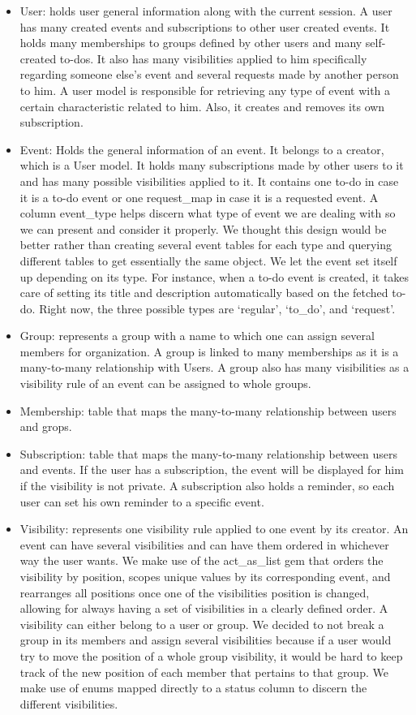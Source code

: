 \documentclass[11pt]{article}
\begin{document}
\begin{itemize}

  \item User: holds user general information along with the current session. A user has many created events and subscriptions to other user created events. It holds many memberships to groups defined by other users and many self-created to-dos. It also has many visibilities applied to him specifically regarding someone else’s event and several requests made by another person to him. A user model is responsible for retrieving any type of event with a certain characteristic related to him. Also, it creates and removes its own subscription.
  \item Event: Holds the general information of an event. It belongs to a creator, which is a User model. It holds many subscriptions made by other users to it and has many possible visibilities applied to it. It contains one to-do in case it is a to-do event or one request\_map in case it is a requested event. A column event\_type helps discern what type of event we are dealing with so we can present and consider it properly. We thought this design would be better rather than creating several event tables for each type and querying different tables to get essentially the same object. We let the event set itself up depending on its type. For instance, when a to-do event is created, it takes care of setting its title and description automatically based on the fetched to-do. Right now, the three possible types are ‘regular’, ‘to\_do’, and ‘request’.
  \item Group: represents a group with a name to which one can assign several members for organization. A group is linked to many memberships as it is a many-to-many relationship with Users. A group also has many visibilities as a visibility rule of an event can be assigned to whole groups.
  \item Membership: table that maps the many-to-many relationship between users and grops.
  \item Subscription: table that maps the many-to-many relationship between users and events. If the user has a subscription, the event will be displayed for him if the visibility is not private. A subscription also holds a reminder, so each user can set his own reminder to a specific event.
  \item Visibility: represents one visibility rule applied to one event by its creator. An event can have several visibilities and can have them ordered in whichever way the user wants. We make use of the act\_as\_list gem that orders the visibility by position, scopes unique values by its corresponding event, and rearranges all positions once one of the visibilities position is changed, allowing for always having a set of visibilities in a clearly defined order. A visibility can either belong to a user or group. We decided to not break a group in its members and assign several visibilities because if a user would try to move the position of a whole group visibility, it would be hard to keep track of the new position of each member that pertains to that group. We make use of enums mapped directly to a status column to discern the different visibilities.

\end{itemize}
\end{document}
